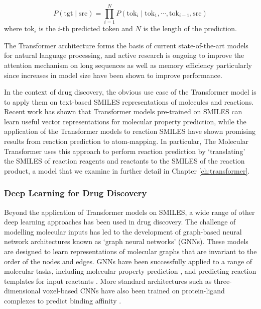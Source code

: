 \begin{equation}
    P(\textrm{tgt} \mid \textrm{src}) = \prod_{i=1}^N P(\textrm{tok}_i \mid \textrm{tok}_1, \cdots , \textrm{tok}_{i-1}, \textrm{src}) 
\end{equation}
where $\textrm{tok}_i$ is the $i$-th predicted token and $N$ is the length of the prediction.

The Transformer architecture forms the basis of current state-of-the-art models for natural language processing, and active research is ongoing to improve the attention mechanism on long sequences as well as memory efficiency particularly since increases in model size have been shown to improve performance.

In the context of drug discovery, the obvious use case of the Transformer model is to apply them on text-based SMILES representations of molecules and reactions. Recent work has shown that Transformer models pre-trained on SMILES can learn useful vector representations for molecular property prediction, while the application of the Transformer models to reaction SMILES have shown promising results from reaction prediction to atom-mapping. In particular, The Molecular Transformer \cite{Schwaller2019MolecularPrediction} uses this approach to perform reaction prediction by `translating' the SMILES of reaction reagents and reactants to the SMILES of the reaction product, a model that we examine in further detail in Chapter \ref{ch:transformer}.

\subsubsection{Deep Learning for Drug Discovery}

Beyond the application of Transformer models on SMILES, a wide range of other deep learning approaches has been used in drug discovery. The challenge of modelling molecular inputs has led to the development of graph-based neural network architectures known as `graph neural networks' (GNNs). These models are designed to learn representations of molecular graphs that are invariant to the order of the nodes and edges. GNNs have been successfully applied to a range of molecular tasks, including molecular property prediction \cite{wu2017molnet, Gilmer17mpnn, Mayr2018compare, yang2019chemprop}, and predicting reaction templates for input reactants \cite{Coley19WLDN5}. More standard architectures such as three-dimensional voxel-based CNNs have also been trained on protein-ligand complexes to predict binding affinity \cite{Ragoza2017ProteinCNN, Imrie2018ProteinCNN, Jimenez2018Kdeep}.

